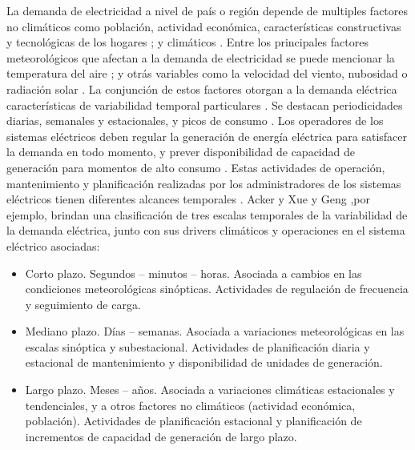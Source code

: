 \documentclass[11pt,a4paper]{article}
\begin{document}
La demanda de electricidad a nivel de país o región depende de multiples factores no climáticos como población, actividad económica, características constructivas y tecnológicas de los hogares \cite{psiloglou2009factors,cassarino2018impact, paliza2021demanda}; y climáticos \cite{moral2005modelling, apadula2012relationships}. Entre los principales factores meteorológicos que afectan a la demanda de electricidad se puede mencionar la temperatura del aire \cite{moral2005modelling, de2015seasonal, cassarino2018impact}; y otrás variables como la velocidad del viento, nubosidad o radiación solar \cite{psiloglou2009factors, apadula2012relationships}. La conjunción de estos factores otorgan a la demanda eléctrica características de variabilidad temporal particulares \cite{zanek2022definicion}. Se destacan periodicidades diarias, semanales y estacionales, y picos de consumo \cite{acker2011iea,zanek2022definicion}. Los operadores de los sistemas eléctricos deben regular la generación de energía eléctrica para satisfacer la demanda en todo momento, y prever disponibilidad de capacidad de generación para momentos de alto consumo \cite{acker2011iea,  thornton2017relationship}. Estas actividades de operación, mantenimiento y planificación realizadas por los administradores de los sistemas eléctricos tienen diferentes alcances temporales \cite{acker2011iea,  khatoon2014effects}. Acker \cite{acker2011iea} y Xue y Geng \cite{xue2012dynamic},por ejemplo, brindan una clasificación de tres escalas temporales de la variabilidad de la demanda eléctrica, junto con sus drivers climáticos y operaciones en el sistema eléctrico asociadas:
\begin{itemize}
	\item  Corto plazo. Segundos – minutos – horas. Asociada a cambios en las condiciones meteorológicas sinópticas. Actividades de regulación de frecuencia y seguimiento de carga.
	\item  Mediano plazo. Días – semanas. Asociada a variaciones meteorológicas en las 	escalas sinóptica y subestacional. Actividades de planificación diaria y estacional	de mantenimiento y disponibilidad de unidades de generación.
	\item  Largo plazo. Meses – años. Asociada a variaciones climáticas estacionales y tendenciales, y a otros factores no climáticos (actividad económica, población). Actividades de planificación estacional y planificación de incrementos de capacidad de generación de largo plazo.
\end{itemize}
\end{document}
